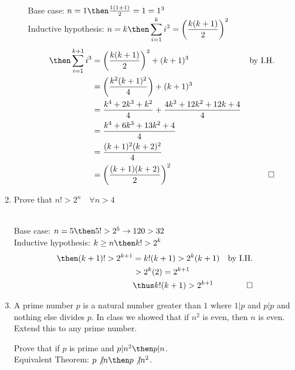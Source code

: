 \documentclass[basic, header]{nosvagor-notes}
\begin{document}
\begin{enumerate}[itemsep=4em]
\begin{enumerate}[leftmargin=2em, itemsep=8em]
        \\
        Base case: \(n = 1 \then \frac{1(1+1)}{2} = 1 = 1^3\) \\
        Inductive hypothesis: \(\displaystyle
        n = k \then
        \sum_{i=1}^{k} i^3 = \left( \frac{k(k+1)}{2} \right)^2
        \)
        \begin{align*}
          \then
          \sum_{i=1}^{k+1} i^3 &=
          \left( \frac{k(k+1)}{2} \right)^2
          + (k+1)^3
          & \text{by I.H.} \\
          &= \left( \frac{k^2 (k+1)^2}{4}\right) + (k+1)^3 \\
          &=  \frac{k^4 + 2k^3+k^2}{4} +
          \frac{4k^3+12k^2+12k+4}{4} \\
          &=  \frac{k^4 + 6k^3+13k^2 + 4}{4} \\
          &= \frac{(k+1)^2 (k+2)^2}{4}\\
          &= \left(\frac{(k+1)(k+2)}{2}\right)^2
          & \qed
        \end{align*}

    \end{enumerate}

  \newpage %

  \item Prove that \(\displaystyle n! > 2^n \quad \forall n > 4 \)

    \\
    Base case: \(n = 5 \then 5! > 2^5 \to 120 > 32 \) \\
    Inductive hypothesis: \(\displaystyle
    k \geq n
    \then
    k! > 2^k
    \)
    \begin{align*}
      \then (k+1)! > 2^{k+1}
      &= k!(k+1) > 2^{k}(k+1)
      & \text{by I.H.} \\
      &> 2^k(2) = 2^{k+1} \\
      &\thus k!(k+1) > 2^{k+1}
      & \qed
    \end{align*}


  \item A prime number \(p\) is a natural number greater than \(1\) where
    \(1|p\) and \(p|p\) and nothing else divides \(p\). In class we showed that
    if \(n^2\) is even, then \(n\) is even. Extend this to any prime number.

    Prove that if \(p\) is prime and \(p|n^2 \then p|n\).\\
    Equivalent Theorem: \(p \not| n \then p \not| n^2\).


\end{enumerate}
\end{document}
